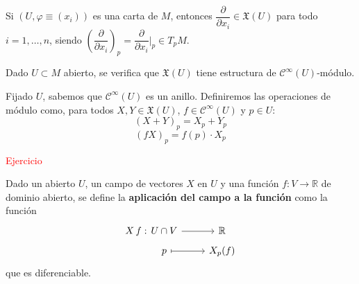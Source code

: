 \begin{ejem}
Si $(U,\varphi\equiv(x_i))$ es una carta de $M$, entonces $\dfrac{\partial}{\partial x_i} \in \mathfrak{X}(U)$ para todo $i = 1,\dots,n$, siendo $\left(\dfrac{\partial}{\partial x_i}\right)_p = \dfrac{\partial}{\partial x_i}\Big|_p \in T_pM$.
\end{ejem}

\begin{prop}
Dado $U \subset M$ abierto, se verifica que $\mathfrak{X}(U)$ tiene estructura de $\mathcal{C}^{\infty}(U)$-módulo.

Fijado $U$, sabemos que $\mathcal{C}^{\infty}(U)$ es un anillo. Definiremos las operaciones de módulo como, para todos $X, Y \in \mathfrak{X}(U)$, $f \in \mathcal{C}^{\infty}(U)$ y $p \in U$:
$$(X+Y)_p = X_p + Y_p$$ $$(fX)_p = f(p) \cdot X_p$$
\end{prop}
\begin{dem}
\textcolor{red}{Ejercicio}
\end{dem}

\begin{defi}
Dado un abierto $U$, un campo de vectores $X$ en $U$ y una función $f: V \to \mathbb{R}$ de dominio abierto, se define la \textbf{aplicación del campo a la función} como la función
$$\begin{tikzcd}
X\,f:\hspace{-10mm} & U \cap V \rar & \mathbb{R}\\[-5mm]
& p \arrow[mapsto]{r} & X_p(f)
\end{tikzcd}$$
que es diferenciable.
\end{defi}

